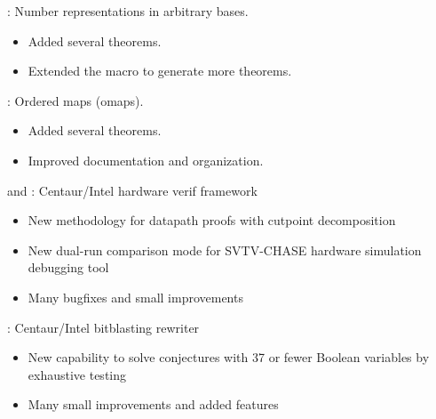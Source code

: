 
\begin{frame}

\implibtitle

:
Number representations in arbitrary bases.
\begin{itemize}
\item Added several theorems.
\item Extended the  macro to generate more theorems.
\end{itemize}

\end{frame}


\begin{frame}

\implibtitle

:
Ordered maps (omaps).
\begin{itemize}
\item Added several theorems.
\item Improved documentation and organization.
\end{itemize}

\end{frame}


\begin{frame}

\implibtitle

 and :
Centaur/Intel hardware verif framework
\begin{itemize}
\item New methodology for datapath proofs with cutpoint decomposition
\item New dual-run comparison mode for SVTV-CHASE hardware simulation debugging tool
\item Many bugfixes and small improvements
\end{itemize}

:
Centaur/Intel bitblasting rewriter
\begin{itemize}
\item New capability to solve conjectures with 37 or fewer Boolean variables by exhaustive testing
\item Many small improvements and added features
\end{itemize}

\end{frame}

